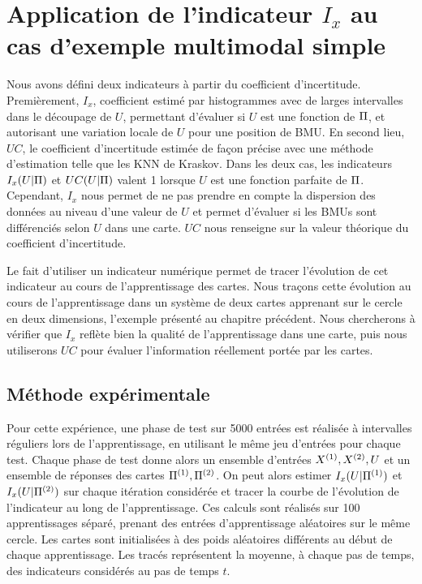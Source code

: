 \documentclass[../main]{subfiles}
\begin{document}
\section{Application de l'indicateur $I_x$ au cas d'exemple multimodal simple}

Nous avons défini deux indicateurs à partir du coefficient d'incertitude. Premièrement, $I_x$, coefficient estimé par histogrammes avec de larges intervalles dans le découpage de $U$, permettant d'évaluer si $U$ est une fonction de $\Pi$, et autorisant une variation locale de $U$ pour une position de BMU.
En second lieu, $UC$, le coefficient d'incertitude estimée de façon précise avec une méthode d'estimation telle que les KNN de Kraskov.
Dans les deux cas, les indicateurs $I_x(U|\Pi)$ et $UC(U|\Pi)$ valent 1 lorsque $U$ est une fonction parfaite de $\Pi$. Cependant, $I_x$ nous permet de ne pas prendre en compte la dispersion des données au niveau d'une valeur de $U$ et permet d'évaluer si les BMUs sont différenciés selon $U$ dans une carte. 
$UC$ nous renseigne sur la valeur théorique du coefficient d'incertitude.

Le fait d'utiliser un indicateur numérique permet de tracer l'évolution de cet indicateur au cours de l'apprentissage des cartes.
Nous traçons cette évolution au cours de l'apprentissage dans un système de deux cartes apprenant sur le cercle en deux dimensions, l'exemple présenté au chapitre précédent.
Nous chercherons à vérifier que $I_x$ reflète bien la qualité de l'apprentissage dans une carte, puis nous utiliserons $UC$ pour évaluer l'information réellement portée par les cartes.

\subsection{Méthode expérimentale}

Pour cette expérience, une phase de test sur 5000 entrées est réalisée à intervalles réguliers lors de l'apprentissage, en utilisant le même jeu d'entrées pour chaque test. Chaque phase de test donne alors un ensemble d'entrées $X^{({1})}, X^{({2})}, U$ et un ensemble de réponses des cartes $\Pi^{({1})}, \Pi^{({2})}$. On peut alors estimer $I_x(U|\Pi^{({1})})$ et $I_x(U|\Pi^{({2})})$ sur chaque itération considérée et tracer la courbe de l'évolution de l'indicateur au long de l'apprentissage. 
Ces calculs sont réalisés sur 100 apprentissages séparé, prenant des entrées d'apprentissage aléatoires sur le même cercle. Les cartes sont initialisées à des poids aléatoires différents au début de chaque apprentissage. 
Les tracés représentent la moyenne, à chaque pas de temps, des indicateurs considérés au pas de temps $t$.
\end{document}
